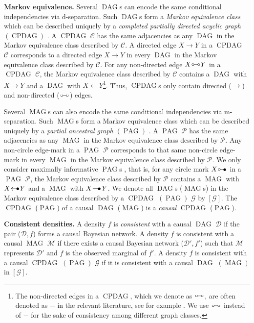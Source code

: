 \documentclass[11pt,a4paper]{article}
\DeclareMathOperator{\CPDAG}{CPDAG}
\DeclareMathOperator{\DAG}{DAG}
\DeclareMathOperator{\MAG}{MAG}
\DeclareMathOperator{\PAG}{PAG}
\newcommand{\g}[1][G]{\mathcal{#1}}
\newcommand{\circbullet}{
  \setlength{\unitlength}{1mm}
  \begin{picture}(5,1)(0,0)
    \put(1,1){\circle{1}}
    \put(1.5,1){\line(1,0){2.4}}
    \put(2.9,0){$\bullet$}
  \end{picture}
}
\newcommand{\arrowbullet}{
  \setlength{\unitlength}{1mm}
  \begin{picture}(5,1)(0,0)
    \put(0.2,0){$\leftarrow$}
    \put(3,0){$\bullet$}
  \end{picture}
}
\newcommand{\tailbullet}{
  \setlength{\unitlength}{1mm}
  \begin{picture}(5,1)(0,0)
    \put(0.4,1){\line(1,0){3.2}}
    \put(2.8,0){$\bullet$}
  \end{picture}
}
\newcommand{\circcirc}{
  \setlength{\unitlength}{1mm}
  \begin{picture}(5,1)(0,0)
    \put(1,1){\circle{1}}
    \put(1.5,1){\line(1,0){2}}
    \put(4,1){\circle{1}}
  \end{picture}
}
\begin{document}
\textbf{Markov equivalence.}
 Several $\DAG$s can encode the same conditional independencies via d-separation. Such $\DAG$s form a \emph{Markov equivalence class} which can be described uniquely by a \emph{completed partially directed acyclic graph $(\CPDAG)$} \citep{meek1995causal}. A $\CPDAG$ $\g[C]$ has the same adjacencies as any $\DAG$ in the Markov equivalence class described by $\g[C]$. A directed edge $X \rightarrow Y$ in a $\CPDAG$ $\g[C]$ corresponds to a directed edge $X \rightarrow Y$ in every $\DAG$ in the Markov equivalence class described by $\g[C]$. For any non-directed edge $X \circcirc Y$ in a $\CPDAG$ $\g[C]$, the Markov equivalence class described by $\g[C]$ contains a $\DAG$ with $X \rightarrow Y$ and a $\DAG$ with $X \leftarrow Y$\footnote{The non-directed edges in a $\CPDAG$, which we denote as $\circcirc$, are often denoted as $-$ in the relevant literature, see for example \citep{meek1995causal}. We use $\circcirc$ instead of $-$ for the sake of consistency among different graph classes.}. 
 Thus, $\CPDAG$s only contain directed ($\rightarrow$) and non-directed ($\circcirc$) edges.

Several $\MAG$s can also encode the same conditional independencies via m-separation. Such $\MAG$s form a Markov equivalence class which can be described uniquely by a \emph{partial ancestral graph $(\PAG)$} \citep{richardson2002ancestral, ali2009markov}. A $\PAG$ $\g[P]$ has the same adjacencies as any $\MAG$ in the Markov equivalence class described by $\g[P]$. Any non-circle edge-mark in a $\PAG$ $\g[P]$ corresponds to that same non-circle edge-mark in every $\MAG$ in the Markov equivalence class described by $\g[P]$. We only consider maximally informative $\PAG$s \citep{zhang2008completeness}, that is, for any circle mark $X \circbullet $ in a $\PAG$ $\g[P]$, the Markov equivalence class described by $\g[P]$ contains a $\MAG$ with $X \arrowbullet Y$ and a $\MAG$ with $X \tailbullet Y$. We denote all $\DAG$s ($\MAG$s) in the Markov equivalence class described by a $\CPDAG$ $(\PAG)$ $\g$ by $[\g]$. The $\CPDAG$ ($\PAG$) of a causal $\DAG$ ($\MAG$) is a \emph{causal} $\CPDAG$ ($\PAG$).

\textbf{Consistent densities.} A density $f$ is \textit{consistent} with a causal $\DAG$ $\g[D]$ if the pair ($\g[D],f$) forms a causal Bayesian network. A density $f$ is consistent with a causal $\MAG$ $\g[M]$ if there exists a causal Bayesian network ($\g[D]',f'$) such that $\g[M]$ represents $\g[D]'$ and $f$ is the observed marginal of $f'$. A density $f$ is consistent with a causal $\CPDAG$ $(\PAG)$ $\g$ if it is consistent with a causal $\DAG$ $(\MAG)$ in $[\g]$.
\end{document}
